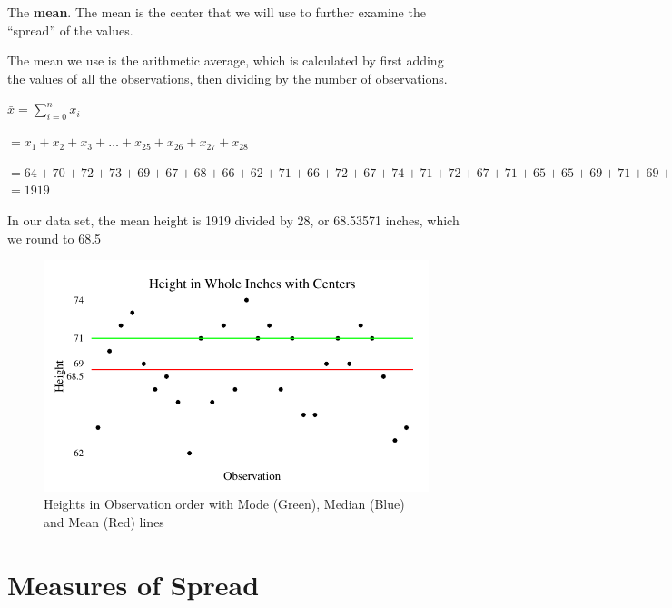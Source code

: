 \documentclass[nohyper,justified]{tufte-handout}\usepackage[]{graphicx}\usepackage[]{color}
\makeatletter
\def\maxwidth{ %
  \ifdim\Gin@nat@width>\linewidth
    \linewidth
  \else
    \Gin@nat@width
  \fi
}
\newenvironment{knitrout}{}{} %
\makeatother
\begin{document}
The \textbf{mean}. The mean is the center that we will use to further examine the ``spread'' of the values.

The mean we use is the arithmetic average, which is calculated by first adding the values of all the observations, then dividing by the number of observations.

$\bar{x}=\sum\limits_{i=0}^{n} x_i$


$=x_1+x_2+x_3+ \dots +x_{25}+x_{26}+x_{27}+x_{28}$



$=  64 + 70 + 72 + 73 + 69 + 67 + 68 + 66 + 62 + 71 + 66 + 72 + 67 + 74 + 71 + 72 + 67 + 71 + 65 + 65 + 69 + 71 + 69 + 72 + 71 + 68 + 63 +64 $
$= 1919 $


In our data set, the mean height is 1919 divided by 28, or 68.53571 inches, which we round to 68.5

\begin{figure}
\begin{knitrout}
\color{fgcolor}

{\centering \includegraphics[width=\maxwidth]{figure/graphics-center-chart-1} 

}



\end{knitrout}
\caption{Heights in Observation order with Mode (Green), Median (Blue) and Mean (Red) lines}
\end{figure}



\section{Measures of Spread}
\end{document}
